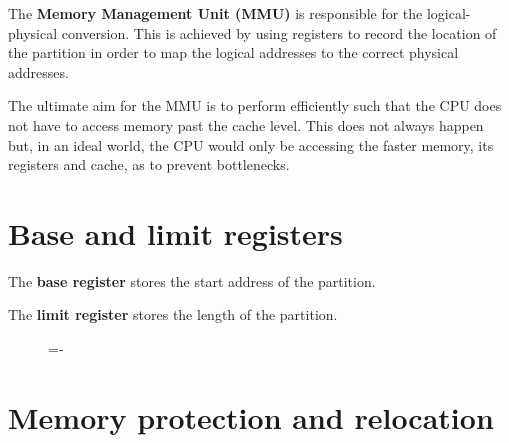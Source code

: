 \documentclass[a4paper]{systems-software}
\begin{document}
The \textbf{Memory Management Unit (MMU)} is responsible for the logical-physical conversion. This is achieved by using registers to record the location of the partition in order to map the logical addresses to the correct physical addresses.

The ultimate aim for the MMU is to perform efficiently such that the CPU does not have to access memory past the cache level. This does not always happen but, in an ideal world, the CPU would only be accessing the faster memory, its registers and cache, as to prevent bottlenecks.


\section*{Base and limit registers}

The \textbf{base register} stores the start address of the partition.

The \textbf{limit register} stores the length of the partition.

\begin{figure}[H]
  \lineskip=-\fboxrule
\end{figure}


\section*{Memory protection and relocation}
\end{document}
